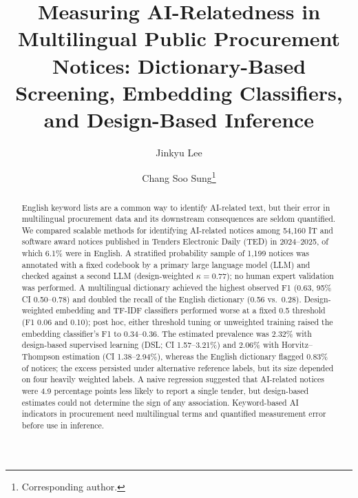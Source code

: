\documentclass[runningheads]{llncs}
\begin{document}
\title{Measuring AI-Relatedness in Multilingual Public Procurement Notices: Dictionary-Based Screening, Embedding Classifiers, and Design-Based Inference}
\author{Jinkyu Lee \and Chang Soo Sung\thanks{Corresponding author.}}
\maketitle

\begin{abstract}
English keyword lists are a common way to identify AI-related text, but their error in multilingual procurement data and its downstream consequences are seldom quantified. We compared scalable methods for identifying AI-related notices among 54,160 IT and software award notices published in Tenders Electronic Daily (TED) in 2024--2025, of which 6.1\% were in English. A stratified probability sample of 1,199 notices was annotated with a fixed codebook by a primary large language model (LLM) and checked against a second LLM (design-weighted $\kappa=0.77$); no human expert validation was performed. A multilingual dictionary achieved the highest observed F1 (0.63, 95\% CI 0.50--0.78) and doubled the recall of the English dictionary (0.56 vs.\ 0.28). Design-weighted embedding and TF-IDF classifiers performed worse at a fixed 0.5 threshold (F1 0.06 and 0.10); post hoc, either threshold tuning or unweighted training raised the embedding classifier's F1 to 0.34--0.36. The estimated prevalence was 2.32\% with design-based supervised learning (DSL; CI 1.57--3.21\%) and 2.06\% with Horvitz--Thompson estimation (CI 1.38--2.94\%), whereas the English dictionary flagged 0.83\% of notices; the excess persisted under alternative reference labels, but its size depended on four heavily weighted labels. A naive regression suggested that AI-related notices were 4.9 percentage points less likely to report a single tender, but design-based estimates could not determine the sign of any association. Keyword-based AI indicators in procurement need multilingual terms and quantified measurement error before use in inference.
\end{abstract}
\end{document}
